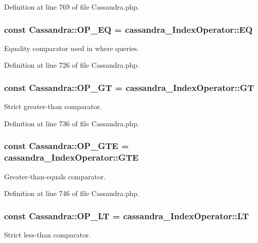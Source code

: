 Definition at line 769 of file Cassandra.php.

\hypertarget{classCassandra_a33b81650dd46405f23e6d469eeb1bd5b}{
\subsubsection[{OP\_\-EQ}]{\setlength{\rightskip}{0pt plus 5cm}const {\bf Cassandra::OP\_\-EQ} = cassandra\_\-IndexOperator::EQ}}
\label{classCassandra_a33b81650dd46405f23e6d469eeb1bd5b}
Equality comparator used in where queries. 

Definition at line 726 of file Cassandra.php.

\hypertarget{classCassandra_a660ca00d7f33558017e15ccc1f8f5d29}{
\subsubsection[{OP\_\-GT}]{\setlength{\rightskip}{0pt plus 5cm}const {\bf Cassandra::OP\_\-GT} = cassandra\_\-IndexOperator::GT}}
\label{classCassandra_a660ca00d7f33558017e15ccc1f8f5d29}
Strict greater-\/than comparator. 

Definition at line 736 of file Cassandra.php.

\hypertarget{classCassandra_a60a245248555c96cadec6977014c27df}{
\subsubsection[{OP\_\-GTE}]{\setlength{\rightskip}{0pt plus 5cm}const {\bf Cassandra::OP\_\-GTE} = cassandra\_\-IndexOperator::GTE}}
\label{classCassandra_a60a245248555c96cadec6977014c27df}
Greater-\/than-\/equals comparator. 

Definition at line 746 of file Cassandra.php.

\hypertarget{classCassandra_acf59b31536a8a886422ef7335020f99d}{
\subsubsection[{OP\_\-LT}]{\setlength{\rightskip}{0pt plus 5cm}const {\bf Cassandra::OP\_\-LT} = cassandra\_\-IndexOperator::LT}}
\label{classCassandra_acf59b31536a8a886422ef7335020f99d}
Strict less-\/than comparator. 

